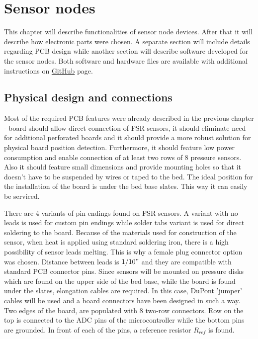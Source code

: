 \chapter{Sensor nodes}
\label{chap:nodes}

This chapter will describe functionalities of sensor node devices. After that it will describe how electronic parts were chosen. A separate section will include details regarding \ac{PCB} design while another section will describe software developed for the sensor nodes. Both software and hardware files are available with additional instructions on \href{github.com/Xenosb/thesis-atmel}{GitHub} page.

\section{Physical design and connections}

Most of the required \ac{PCB} features were already described in the previous chapter - board should allow direct connection of \ac{FSR} sensors, it should eliminate need for additional perforated boards and it should provide a more robust solution for physical board position detection. Furthermore, it should feature low power consumption and enable connection of at least two rows of 8 pressure sensors. Also it should feature small dimensions and provide mounting holes so that it doesn't have to be suspended by wires or taped to the bed. The ideal position for the installation of the board is under the bed base slates. This way it can easily be serviced.

There are 4 variants of pin endings found on \ac{FSR} sensors. A variant with no leads is used for custom pin endings while solder tabs variant is used for direct soldering to the board. Because of the materials used for construction of the sensor, when heat is applied using standard soldering iron, there is a high possibility of sensor leads melting. This is why a female plug connector option was chosen. Distance between leads is $1/10"$ and they are compatible with standard \ac{PCB} connector pins. Since sensors will be mounted on pressure disks which are found on the upper side of the bed base, while the board is found under the slates, elongation cables are required. In this case, DuPont 'jumper' cables will be used and a board connectors have been designed in such a way. Two edges of the board, are populated with 8 two-row connectors. Row on the top is connected to the \ac{ADC} pins of the microcontroller while the bottom pins are grounded. In front of each of the pins, a reference resistor $R_{ref}$ is found.

